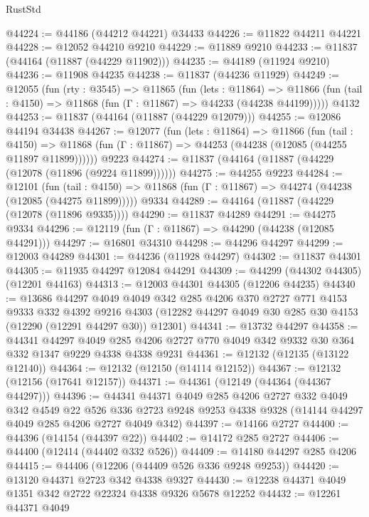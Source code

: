 \begin{lexlean}{RustStd}
\begin{coremodule}
@44224 := @44186 (@44212 @44221) @34433
@44226 := @11822 @44211 @44221
@44228 := @12052 @44210 @9210
@44229 := @11889 @9210
@44233 := @11837 (@44164 (@11887 (@44229 @11902)))
@44235 := @44189 (@11924 @9210)
@44236 := @11908 @44235
@44238 := @11837 (@44236 @11929)
@44249 := @12055
    (fun (rty : @3545) =>
    @11865
      (fun (lets : @11864) =>
      @11866 (fun (tail : @4150) => @11868 (fun (Γ : @11867) => @44233 (@44238 @44199)))))
    @4132
@44253 := @11837 (@44164 (@11887 (@44229 @12079)))
@44255 := @12086 @44194 @34438
@44267 := @12077
    (fun (lets : @11864) =>
    @11866
      (fun (tail : @4150) =>
      @11868 (fun (Γ : @11867) => @44253 (@44238 (@12085 (@44255 @11897 @11899))))))
    @9223
@44274 := @11837 (@44164 (@11887 (@44229 (@12078 (@11896 (@9224 @11899))))))
@44275 := @44255 @9223
@44284 := @12101
    (fun (tail : @4150) => @11868 (fun (Γ : @11867) => @44274 (@44238 (@12085 (@44275 @11899)))))
    @9334
@44289 := @44164 (@11887 (@44229 (@12078 (@11896 @9335))))
@44290 := @11837 @44289
@44291 := @44275 @9334
@44296 := @12119 (fun (Γ : @11867) => @44290 (@44238 (@12085 @44291)))
@44297 := @16801 @34310
@44298 := @44296 @44297
@44299 := @12003 @44289
@44301 := @44236 (@11928 @44297)
@44302 := @11837 @44301
@44305 := @11935 @44297 @12084 @44291
@44309 := @44299 (@44302 @44305) (@12201 @44163)
@44313 := @12003 @44301 @44305 (@12206 @44235)
@44340 := @13686
    @44297
    @4049
    @4049
    @342
    @285
    @4206
    @370
    @2727
    @771
    @4153
    @9333
    @332
    @4392
    @9216
    @4303
    (@12282 @44297 @4049 @30 @285 @30 @4153 (@12290 (@12291 @44297 @30)) @12301)
@44341 := @13732 @44297
@44358 := @44341
    @44297
    @4049
    @285
    @4206
    @2727
    @770
    @4049
    @342
    @9332
    @30
    @364
    @332
    @1347
    @9229
    @4338
    @4338
    @9231
@44361 := @12132 (@12135 (@13122 @12140))
@44364 := @12132 (@12150 (@14114 @12152))
@44367 := @12132 (@12156 (@17641 @12157))
@44371 := @44361 (@12149 (@44364 (@44367 @44297)))
@44396 := @44341
    @44371
    @4049
    @285
    @4206
    @2727
    @332
    @4049
    @342
    @4549
    @22
    @526
    @336
    @2723
    @9248
    @9253
    @4338
    @9328
    (@14144 @44297 @4049 @285 @4206 @2727 @4049 @342)
@44397 := @14166 @2727
@44400 := @44396 (@14154 (@44397 @22))
@44402 := @14172 @285 @2727
@44406 := @44400 (@12414 (@44402 @332 @526))
@44409 := @14180 @44297 @285 @4206
@44415 := @44406 (@12206 (@44409 @526 @336 @9248 @9253))
@44420 := @13120 @44371 @2723 @342 @4338 @9327
@44430 := @12238 @44371 @4049 @1351 @342 @2722 @22324 @4338 @9326 @5678 @12252
@44432 := @12261 @44371 @4049

\end{coremodule}
\end{lexlean}
